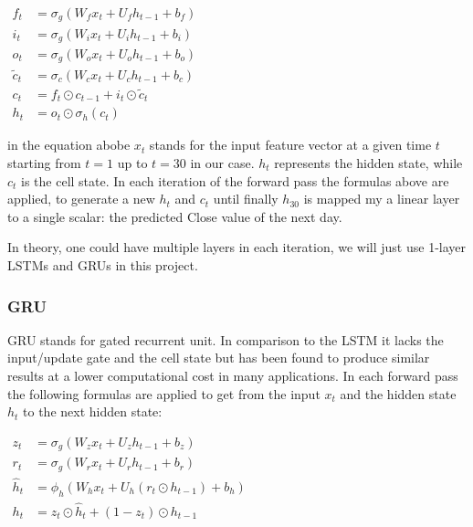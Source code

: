 \documentclass[utf8x]{ctexart}
\begin{document}
\begin{math}
    \begin{aligned}f_{t}            & =\sigma _{g}(W_{f}x_{t}+U_{f}h_{t-1}+b_{f})     \\
               i_{t}            & =\sigma _{g}(W_{i}x_{t}+U_{i}h_{t-1}+b_{i})     \\
               o_{t}            & =\sigma _{g}(W_{o}x_{t}+U_{o}h_{t-1}+b_{o})     \\
               {\tilde {c}}_{t} & =\sigma _{c}(W_{c}x_{t}+U_{c}h_{t-1}+b_{c})     \\
               c_{t}            & =f_{t}\odot c_{t-1}+i_{t}\odot {\tilde {c}}_{t} \\
               h_{t}            & =o_{t}\odot \sigma _{h}(c_{t})
    \end{aligned}
\end{math}

in the equation abobe $x_t$ stands for the input feature vector at a given time $t$ starting from $t = 1$ up to $t = 30$ in our case. $h_t$ represents the hidden state, while $c_t$ is the cell state. In each iteration of the forward pass the formulas above are applied, to generate a new $h_t$ and $c_t$ until finally $h_{30}$ is mapped my a linear layer to a single scalar: the predicted Close value of the next day.

In theory, one could have multiple layers in each iteration, we will just use 1-layer LSTMs and GRUs in this project.

\subsubsection{GRU}

GRU stands for gated recurrent unit. In comparison to the LSTM it lacks the input/update gate and the cell state but has been found to produce similar results at a lower computational cost in many applications. In each forward pass the following formulas are applied to get from the input $x_t$ and the hidden state $h_t$ to the next hidden state:


\begin{math}
    \begin{aligned}z_{t}          & =\sigma _{g}(W_{z}x_{t}+U_{z}h_{t-1}+b_{z})            \\
               r_{t}          & =\sigma _{g}(W_{r}x_{t}+U_{r}h_{t-1}+b_{r})            \\
               {\hat {h}}_{t} & =\phi _{h}(W_{h}x_{t}+U_{h}(r_{t}\odot h_{t-1})+b_{h}) \\
               h_{t}          & =z_{t}\odot {\hat {h}}_{t}+(1-z_{t})\odot h_{t-1}\end{aligned}
\end{math}
\end{document}
